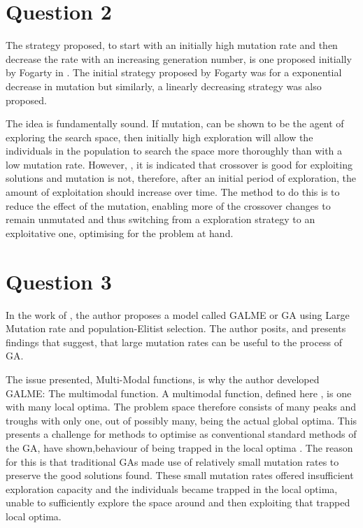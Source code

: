\documentclass[12pt]{article}
\begin{document}
\section{Question 2}
The strategy proposed, to start with an initially high mutation rate and then decrease the rate with an increasing generation number, is one proposed initially by Fogarty in \cite{Fogarty:1989:VPM:93126.93162}. The initial strategy proposed by Fogarty was for a exponential decrease in mutation but similarly, a linearly decreasing strategy was also proposed. 

The idea is fundamentally sound. If mutation, \cite{spears_1993} can be shown to be the agent of exploring the search space, then initially high exploration will allow the individuals in the population to search the space more thoroughly than with a low mutation rate. However, \cite{Gupta_anoverview}, it is indicated that crossover is good for exploiting solutions and mutation is not, therefore, after an initial period of exploration, the amount of exploitation should increase over time. The method to do this is to reduce the effect of the mutation, enabling more of the crossover changes to remain unmutated and thus switching from a exploration strategy to an exploitative one, optimising for the problem at hand.
\section{Question 3}
In the work of \cite{560396}, the author proposes a model called GALME or GA using Large Mutation rate and population-Elitist selection. The author posits, and presents findings that suggest, that large mutation rates can be useful to the process of GA.

The issue presented, Multi-Modal functions, is why the author developed GALME: The multimodal function. A multimodal function, defined here \cite{beasley_bull_martin_1993}, is one with many local optima. The problem space therefore consists of many peaks and troughs with only one, out of possibly many, being the actual global optima. This presents a challenge for methods to optimise as conventional standard methods of the GA, have shown,behaviour of being trapped in the local optima \cite{560396}. The reason for this is that traditional GAs made use of relatively small mutation rates to preserve the good solutions found. These small mutation rates offered insufficient exploration capacity and the individuals became trapped in the local optima, unable to sufficiently explore the space around and then exploiting that trapped local optima.
\end{document}
